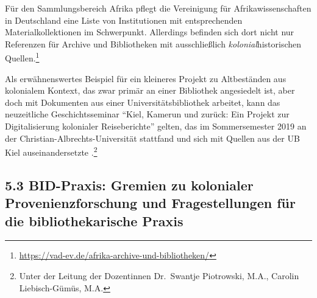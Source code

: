 \documentclass[a4paper,
fontsize=11pt,
oneside,
numbers=noperiodatend,
parskip=half-,
bibliography=totoc,
final
]{scrartcl}
\begin{document}
Für den Sammlungsbereich Afrika pflegt die Vereinigung für
Afrikawissenschaften in Deutschland eine Liste von Institutionen mit
entsprechenden Materialkollektionen im Schwerpunkt. Allerdings befinden
sich dort nicht nur Referenzen für Archive und Bibliotheken mit
ausschließlich \emph{kolonial}historischen Quellen.\footnote{\url{https://vad-ev.de/afrika-archive-und-bibliotheken/}}

Als erwähnenswertes Beispiel für ein kleineres Projekt zu Altbeständen
aus kolonialem Kontext, das zwar primär an einer Bibliothek angesiedelt
ist, aber doch mit Dokumenten aus einer Universitätsbibliothek arbeitet,
kann das neuzeitliche Geschichtsseminar \enquote{Kiel, Kamerun und
zurück: Ein Projekt zur Digitalisierung kolonialer Reiseberichte}
gelten, das im Sommersemester 2019 an der
Christian-Albrechts-Universität stattfand und sich mit Quellen aus der
UB Kiel auseinandersetzte .\footnote{Unter der Leitung der Dozentinnen
  Dr.~Swantje Piotrowski, M.A., Carolin Liebisch-Gümüs, M.A.}

\hypertarget{bid-praxis-gremien-zu-kolonialer-provenienzforschung-und-fragestellungen-fuxfcr-die-bibliothekarische-praxis}{%
\subsection{5.3 BID-Praxis: Gremien zu kolonialer Provenienzforschung und
Fragestellungen für die bibliothekarische
Praxis}\label{bid-praxis-gremien-zu-kolonialer-provenienzforschung-und-fragestellungen-fuxfcr-die-bibliothekarische-praxis}}
\end{document}
